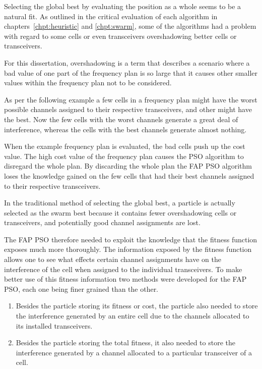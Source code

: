 Selecting the global best by evaluating the position as a whole seems to be a natural fit. As outlined in the critical evaluation of each algorithm in chapters~\ref{chpt:heuristic} and \ref{chpt:swarm}, some of the algorithms had a problem with regard to some cells or even transceivers overshadowing better cells or transceivers.

For this dissertation, overshadowing is a term that describes a scenario where a bad value of one part of the frequency plan is so large that it causes other smaller values within the frequency plan not to be considered. 

As per the following example a few cells in a frequency plan might have the worst possible channels assigned to their respective transceivers, and other might have the best. Now the few cells with the worst channels generate a great deal of interference, whereas the cells with the best channels generate almost nothing.

When the example frequency plan is evaluated, the bad cells push up the cost value. The high cost value of the frequency plan causes the PSO algorithm to disregard the whole plan. By discarding the whole plan the FAP PSO algorithm loses the knowledge gained on the few cells that had their best channels assigned to their respective transceivers.

In the traditional method of selecting the global best, a particle is actually selected as the swarm best because it contains fewer overshadowing cells or transceivers, and potentially good channel assignments are lost.

The FAP PSO therefore needed to exploit the knowledge that the fitness function exposes much more thoroughly. The information exposed by the fitness function allows one to see what effects certain channel assignments have on the interference of the cell when assigned to the individual transceivers. To make better use of this fitness information two methods were developed for the FAP PSO, each one being finer grained than the other.

\begin{enumerate}
\item Besides the particle storing its fitness or cost, the particle also needed to store the interference generated by an entire cell due to the channels allocated to its installed transceivers.
\item Besides the particle storing the total fitness, it also needed to store the interference generated by a channel allocated to a particular transceiver of a cell.
\end{enumerate}

